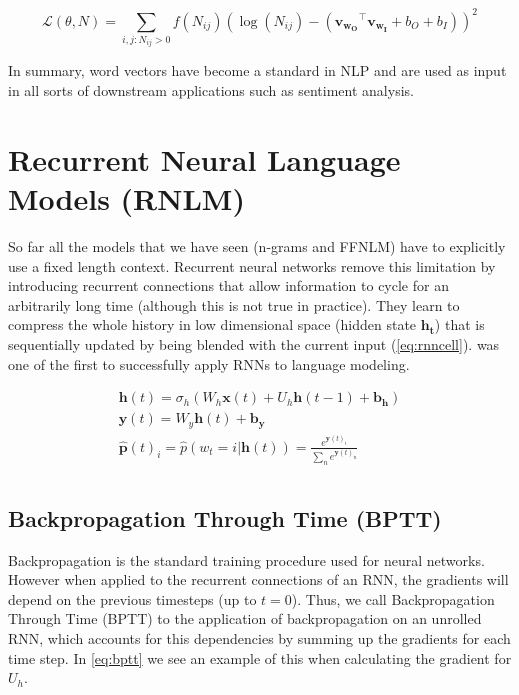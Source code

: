 \begin{equation} \label{eq:glove}
	\mathcal{L}(\theta, N) = \sum_{i,j:N_{ij}>0}f(N_{ij})(\log(N_{ij})-(\mathbf{v_{w_O}}^{\top} \mathbf{v_{w_I}} + b_O + b_I))^2
\end{equation}

In summary, word vectors have become a standard in NLP and are used as input in all sorts of downstream applications such as sentiment analysis.

\section{Recurrent Neural Language Models (RNLM)}
\label{sec:rnn}

So far all the models that we have seen (n-grams and FFNLM) have to explicitly use a fixed length context. Recurrent neural networks remove this limitation by introducing recurrent connections that allow information to cycle for an arbitrarily long time (although this is not true in practice). They learn to compress the whole
history in low dimensional space (hidden state $\mathbf{h_t}$) that is sequentially updated by being blended with the current input (\autoref{eq:rnncell}).   \cite{mikolov2010recurrent}  was one of the first to successfully apply RNNs to language modeling.

\begin{equation} \label{eq:rnncell}
	\begin{gathered}
		\mathbf{h}(t) = \sigma_h(W_h \mathbf{x}(t) + U_h \mathbf{h}(t-1) + \mathbf{b_h}) \\
		\mathbf{y}(t) = W_y \mathbf{h}(t) + \mathbf{b_y} \\
		\mathbf{\hat{p}}(t)_i= \hat{p}(w_t=i|\mathbf{h}(t)) = \frac{e^{\mathbf{y}(t)_i}}{\sum_{n}e^{\mathbf{y}(t)_n}} \\
	\end{gathered}
\end{equation}

\subsection{Backpropagation Through Time (BPTT)}

Backpropagation is the standard training procedure used for neural networks. However when applied to the recurrent connections of an RNN, the gradients will depend on the previous timesteps (up to $t=0$). Thus, we call Backpropagation Through Time (BPTT) to the application of backpropagation on an unrolled RNN, which accounts for this dependencies by summing up the gradients for each time step. In \autoref{eq:bptt} we see an example of this when calculating the gradient for $U_h$.

